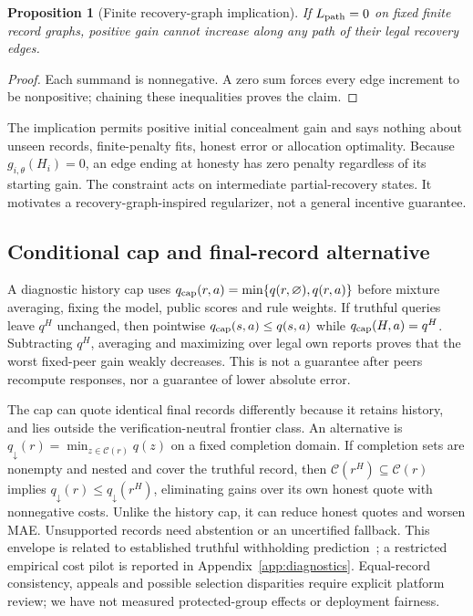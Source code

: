 \documentclass[11pt]{article}
\newtheorem{proposition}{Proposition}
\begin{document}
\begin{proposition}[Finite recovery-graph implication]\label{prop:rpl}
If $L_{\rm path}=0$ on fixed finite record graphs, positive gain cannot increase
along any path of their legal recovery edges.
\end{proposition}
\begin{proof}
Each summand is nonnegative. A zero sum forces every edge increment to be
nonpositive; chaining these inequalities proves the claim.
\end{proof}
The implication permits positive initial concealment gain and says nothing
about unseen records, finite-penalty fits, honest error or allocation optimality.
Because $g_{i,\theta}(H_i)=0$, an edge ending at honesty has zero penalty regardless of its starting gain. The constraint acts on intermediate partial-recovery states. It motivates a recovery-graph-inspired regularizer, not a general incentive guarantee.

\subsection{Conditional cap and final-record alternative}
A diagnostic history cap uses
$q_{\rm cap}(r,a)=\min\{q(r,\varnothing),q(r,a)\}$ before mixture averaging,
fixing the model, public scores and rule weights. If truthful queries leave
$q^H$ unchanged, then pointwise $q_{\rm cap}(s,a)\le q(s,a)$ while
$q_{\rm cap}(H,a)=q^H$. Subtracting $q^H$, averaging and maximizing over
legal own reports proves that the worst fixed-peer gain weakly decreases.
This is not a guarantee after peers recompute responses, nor a guarantee of
lower absolute error.

The cap can quote identical final records differently because it retains
history, and lies outside the verification-neutral frontier class.
An alternative is $q_{\downarrow}(r)=\min_{z\in\mathcal C(r)}q(z)$ on a
fixed completion domain. If completion sets are nonempty and nested and
cover the truthful record, then
$\mathcal C(r^H)\subseteq\mathcal C(r)$ implies
$q_{\downarrow}(r)\le q_{\downarrow}(r^H)$, eliminating gains over its own
honest quote with nonnegative costs. Unlike the history cap, it can reduce
honest quotes and worsen MAE. Unsupported records need abstention or an
uncertified fallback. This envelope is related to established truthful
withholding prediction~\cite{withheld,smi}; a restricted empirical cost pilot
is reported in Appendix~\ref{app:diagnostics}. Equal-record consistency,
appeals and possible selection disparities require explicit platform review;
we have not measured protected-group effects or deployment fairness.
\end{document}
